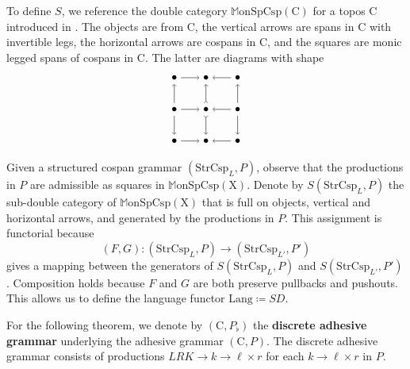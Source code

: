 \documentclass{amsart}
\newcommand{\C}{\cat{C}}
\newcommand{\X}{\cat{X}}
\newcommand{\StrCsp}{\cat{StrCsp}}
\newcommand{\MonSpCsp}{\dblcat{M} \cat{onSpCsp}}
\newcommand{\Lang}{\mathrm{Lang}}
\newcommand{\defn}[1]{\textbf{#1}}
\newcommand{\cat}[1]{\mathrm{#1}}
\newcommand{\dblcat}[1]{\mathbb{#1}}
\newcommand{\from}{\colon}
\theoremstyle{remark}
\theoremstyle{definition}
\begin{document}
To define $ S $, we reference the double category $ \MonSpCsp (\C) $
for a topos $ \C $ introduced in \cite{CicCour_SpCspTopos}.  The
objects are from $ \C $, the vertical arrows are spans in $ \C $ with
invertible legs, the horizontal arrows are cospans in $ \C $, and the
squares are monic legged spans of cospans in $ \C $. The latter are
diagrams with shape
%
\[
\begin{tikzpicture}
  \node (00) at (0,0) {$ \bullet $};
  \node (01) at (0,1) {$ \bullet $};
  \node (02) at (0,2) {$ \bullet $};
  \node (10) at (1,0) {$ \bullet $};
  \node (11) at (1,1) {$ \bullet $};
  \node (12) at (1,2) {$ \bullet $};
  \node (20) at (2,0) {$ \bullet $};
  \node (21) at (2,1) {$ \bullet $};
  \node (22) at (2,2) {$ \bullet $};
  \draw [->] (02) to node [] {\scriptsize{$  $}} (12);
  \draw [->] (22) to node [] {\scriptsize{$  $}} (12);
  \draw [->] (01) to node [] {\scriptsize{$  $}} (11);
  \draw [->] (21) to node [] {\scriptsize{$  $}} (11);
  \draw [->] (00) to node [] {\scriptsize{$  $}} (10);
  \draw [->] (20) to node [] {\scriptsize{$  $}} (10);
  \draw [->] (01) to node [] {\scriptsize{$  $}} (02);
  \draw [->] (01) to node [] {\scriptsize{$  $}} (00);
  \draw [>->] (11) to node [] {\scriptsize{$  $}} (12);
  \draw [>->] (11) to node [] {\scriptsize{$  $}} (10);
  \draw [->] (21) to node [] {\scriptsize{$  $}} (22);
  \draw [->] (21) to node [] {\scriptsize{$  $}} (20);
\end{tikzpicture}
\]
%

Given a structured cospan grammar $ ( \StrCsp_L , P ) $, observe that
the productions in $ P $ are admissible as squares in
$ \MonSpCsp (\X) $. Denote by $ S ( \StrCsp_L , P ) $ the sub-double
category of $ \MonSpCsp ( \X ) $ that is full on objects, vertical and
horizontal arrows, and generated by the productions in
$ P $. This assignment is functorial
%
%
because
%
\[
  (F,G) \from ( \StrCsp_{L} , P ) \to ( \StrCsp_{L'} , P' )
\]
% 
gives a mapping between the generators of $ S ( \StrCsp_{L} , P ) $
and $ S ( \StrCsp_{L'} , P' ) $.  Composition holds because
$ F $ and $ G $ are both preserve pullbacks and pushouts. This allows
us to define the language functor $ \Lang \coloneqq SD $.  

For the following theorem, we denote by $ ( \C , P_{\flat} ) $ the
\defn{discrete adhesive grammar} underlying the adhesive grammar $ (
\C , P ) $. The discrete adhesive grammar consists of productions $
LRK \to k \to \ell \times r $ for each $ k \to \ell \times r $ in $ P $. 
\end{document}
